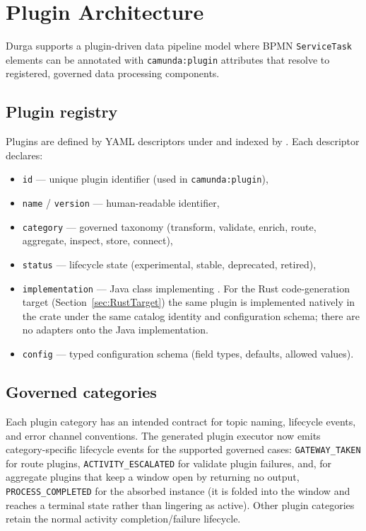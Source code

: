 \section{Plugin Architecture}
\label{sec:PluginArchitecture}

Durga supports a plugin-driven data pipeline model where BPMN \texttt{ServiceTask}
elements can be annotated with \texttt{camunda:plugin} attributes that resolve to
registered, governed data processing components.

\subsection{Plugin registry}

Plugins are defined by YAML descriptors under  and indexed by
. Each descriptor declares:

\begin{itemize}
\item \texttt{id} --- unique plugin identifier (used in \texttt{camunda:plugin}),
\item \texttt{name} / \texttt{version} --- human-readable identifier,
\item \texttt{category} --- governed taxonomy (transform, validate, enrich, route, aggregate, inspect, store, connect),
\item \texttt{status} --- lifecycle state (experimental, stable, deprecated, retired),
\item \texttt{implementation} --- Java class implementing
. For the Rust code-generation
target (Section~\ref{sec:RustTarget}) the same plugin is implemented natively in
the  crate under the same catalog identity and configuration
schema; there are no adapters onto the Java implementation.
\item \texttt{config} --- typed configuration schema (field types, defaults, allowed values).
\end{itemize}

\subsection{Governed categories}

Each plugin category has an intended contract for topic naming, lifecycle events,
and error channel conventions. The generated plugin executor now emits
category-specific lifecycle events for the supported governed cases:
\texttt{GATEWAY\_TAKEN} for route plugins, \texttt{ACTIVITY\_ESCALATED} for
validate plugin failures, and, for aggregate plugins that keep a window open by
returning no output, \texttt{PROCESS\_COMPLETED} for the absorbed instance (it is
folded into the window and reaches a terminal state rather than lingering as
active). Other plugin categories retain the normal activity completion/failure
lifecycle.

